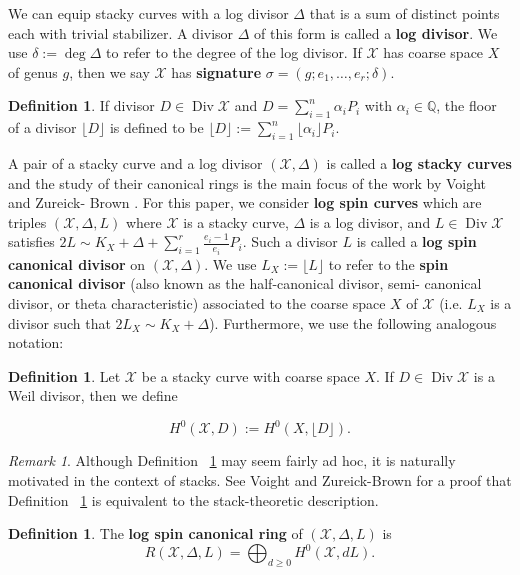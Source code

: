 \documentclass{amsart}
\theoremstyle{plain}
\theoremstyle{definition}
\newtheorem{defn}[thm]{Definition}
\theoremstyle{remark}
\newtheorem{rem}[thm]{Remark}
\numberwithin{equation}{section}
\newcommand\BQ{{\mathbb Q}}
\DeclareMathOperator\di{Div}
\newcommand\sx{\mathscr X}
\newcommand{\halfcan}{L}
\begin{document}
We can equip stacky curves with a log divisor $\Delta$ that is a 
sum of distinct points each with trivial stabilizer. A divisor
$\Delta$ of this form is called a \textbf{log divisor}. We use
$\delta := \deg \Delta$ to refer to the degree of the log divisor.
If $\sx$ has coarse space $X$ of genus $g$, then we say $\sx$ has
\textbf{signature} $\sigma = (g; e_1, \ldots, e_r; \delta)$.

\begin{defn}
\label{defn:divisor-floor}
If divisor $D \in \di \sx$ and $D = \sum_{i = 1}^{n} \alpha_i P_i$
with $\alpha_i \in \BQ$, the floor of a divisor $\lfloor D
\rfloor$ is defined to be $\lfloor D \rfloor := \sum_{i = 1}^{n}
\lfloor \alpha_i \rfloor P_i$.
\end{defn}

A pair of a stacky curve and a log divisor $(\sx, \Delta)$ is
called a \textbf{log stacky curves} and the study of their
canonical rings is the main focus of the work by Voight and Zureick-
Brown \cite{vzb:stacky}. For this paper, we consider \textbf{log
spin curves} which are triples $(\sx, \Delta, \halfcan)$ where $\sx$
is a stacky curve, $\Delta$ is a log divisor, and $\halfcan \in \di
\sx$ satisfies $2 \halfcan \sim K_X + \Delta + \sum_{i = 1}^{r}
\frac{e_i - 1}{e_i} P_i$. Such a divisor $\halfcan$ is called a
\textbf{log spin canonical divisor} on $(\sx, \Delta)$. We use
$\halfcan_X := \lfloor L \rfloor $ to refer to the \textbf{spin
canonical divisor} (also known as the half-canonical divisor, semi-
canonical divisor, or theta characteristic) associated to the
coarse space $X$ of $\sx$  (i.e. $\halfcan_X$ is a divisor such
that $2\halfcan_X \sim K_X + \Delta$). Furthermore, we use the
following analogous notation:

\begin{defn}
\label{defn:h0-stacky}
Let $\sx$ be a stacky curve with coarse space $X$.
If $D \in \di \sx$ is a Weil divisor, then we define

\[
	H^0(\sx, D) := H^0(X, \lfloor D \rfloor).
\]
\end{defn}

\begin{rem}
Although Definition ~\ref{defn:h0-stacky} may seem fairly ad hoc, it is naturally motivated in the context of stacks. See Voight and Zureick-Brown \cite[Lemma 5.4.7]{vzb:stacky} for a proof that Definition ~\ref{defn:h0-stacky} is equivalent to the stack-theoretic description.
\end{rem}

\begin{defn}
\label{defn:log-spin-canonical-ring}
The {\bf log spin canonical ring} of $(\sx, \Delta, \halfcan)$ is
\[
	R(\sx, \Delta, \halfcan) = \bigoplus_{d \geq 0} H^0(\sx, d \halfcan).
\]
\end{defn}
\end{document}
